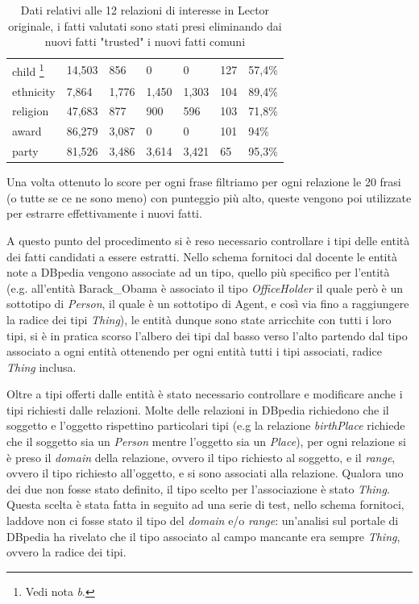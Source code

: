 \documentclass[10pt,a4paper,twocolumn]{article}
\begin{document}
\begin{table}[t]
\begin{minipage}{\textwidth}
\begin{tabular}{lllllll}
		child \footnote{Vedi nota \textit{b}.}                & 14,503               & 856                      & 0                          & 0            & 127        & 57,4\%     \\
		ethnicity            & 7,864                & 1,776                    & 1,450                      & 1,303        & 104        & 89,4\%     \\
		religion             & 47,683               & 877                      & 900                        & 596          & 103        & 71,8\%     \\
		award                & 86,279               & 3,087                    & 0                          & 0            & 101        & 94\%       \\
		party                & 81,526               & 3,486                    & 3,614                      & 3,421        & 65         & 95,3\%    
		\end{tabular}
	\end{minipage}
	\caption{Dati relativi alle 12 relazioni di interesse in Lector originale, i fatti valutati sono stati presi eliminando dai nuovi fatti "trusted" i nuovi fatti comuni}
	\label{dati}
\end{table}

Una volta ottenuto lo score per ogni frase filtriamo per ogni relazione le 20 frasi (o tutte se ce ne sono meno) con punteggio più alto, queste vengono poi utilizzate per estrarre effettivamente i nuovi fatti. 

A questo punto del procedimento si è reso necessario controllare i tipi delle entità dei fatti candidati a essere estratti. Nello schema fornitoci dal docente le entità note a DBpedia vengono associate ad un tipo, quello più specifico per l'entità (e.g. all'entità Barack\_Obama è associato il tipo \textit{OfficeHolder} il quale però è un sottotipo di \textit{Person}, il quale è un sottotipo di Agent, e così via fino a raggiungere la radice dei tipi \textit{Thing}), le entità dunque sono state arricchite con tutti i loro tipi, si è in pratica scorso l'albero dei tipi dal basso verso l'alto partendo dal tipo associato a ogni entità ottenendo per ogni entità tutti i tipi associati, radice \textit{Thing} inclusa.

Oltre a tipi offerti dalle entità è stato necessario controllare e modificare anche i tipi richiesti dalle relazioni. Molte delle relazioni in DBpedia richiedono che il soggetto e l'oggetto rispettino particolari tipi (e.g la relazione \textit{birthPlace} richiede che il soggetto sia un \textit{Person} mentre l'oggetto sia un \textit{Place}), per ogni relazione si è preso il \textit{domain} della relazione, ovvero il tipo richiesto al soggetto, e il \textit{range}, ovvero il tipo richiesto all'oggetto, e si sono associati alla relazione. Qualora uno dei due non fosse stato definito, il tipo scelto per l'associazione è stato \textit{Thing}. Questa scelta è stata fatta in seguito ad una serie di test, nello schema fornitoci, laddove non ci fosse stato il tipo del \textit{domain} e/o \textit{range}: un'analisi sul portale di DBpedia ha rivelato che il tipo associato al campo mancante era sempre \textit{Thing}, ovvero la radice dei tipi.
\end{document}

